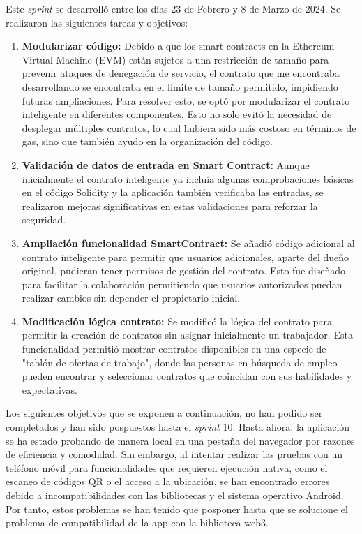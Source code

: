 Este \textit{sprint} se desarrolló entre los días 23 de Febrero y 8 de Marzo de 2024. Se realizaron las siguientes tareas y objetivos:

\begin{enumerate}

\item \textbf{Modularizar código:} Debido a que los smart contracts en la Ethereum Virtual Machine (EVM) están sujetos a una restricción de tamaño para prevenir ataques de denegación de servicio, el contrato que me encontraba desarrollando se encontraba en el límite de tamaño permitido, impidiendo futuras ampliaciones. 
Para resolver esto, se optó por modularizar el contrato inteligente en diferentes componentes. Esto no solo evitó la necesidad de desplegar múltiples contratos, lo cual hubiera sido más costoso en términos de gas, sino que también ayudo en la organización del código.

\item \textbf{Validación de datos de entrada en Smart Contract:} Aunque inicialmente el contrato inteligente ya incluía algunas comprobaciones básicas en el código Solidity y la aplicación también verificaba las entradas, se realizaron mejoras significativas en estas validaciones para reforzar la seguridad.

\item \textbf{Ampliación funcionalidad SmartContract:} Se añadió código adicional al contrato inteligente para permitir que usuarios adicionales, aparte del dueño original, pudieran tener permisos de gestión del contrato. Esto fue diseñado para facilitar la colaboración permitiendo que usuarios autorizados puedan realizar cambios sin depender el propietario inicial.

\item \textbf{Modificación lógica contrato:} Se modificó la lógica del contrato para permitir la creación de contratos sin asignar inicialmente un trabajador. Esta funcionalidad permitió mostrar contratos disponibles en una especie de "tablón de ofertas de trabajo", donde las personas en búsqueda de empleo pueden encontrar y seleccionar contratos que coincidan con sus habilidades y expectativas.

\end{enumerate}

Los siguientes objetivos que se exponen a continuación, no han podido ser completados y han sido pospuestos hasta el \textit{sprint} 10.
Hasta ahora, la aplicación se ha estado probando de manera local en una pestaña del navegador por razones de eficiencia y comodidad. Sin embargo, al intentar realizar las pruebas con un teléfono móvil para funcionalidades que requieren ejecución nativa, como el escaneo de códigos QR o el acceso a la ubicación, se han encontrado errores debido a incompatibilidades con las bibliotecas y el sistema operativo Android.  
Por tanto, estos problemas se han tenido que posponer hasta que se solucione el problema de compatibilidad de la app con la biblioteca web3.

